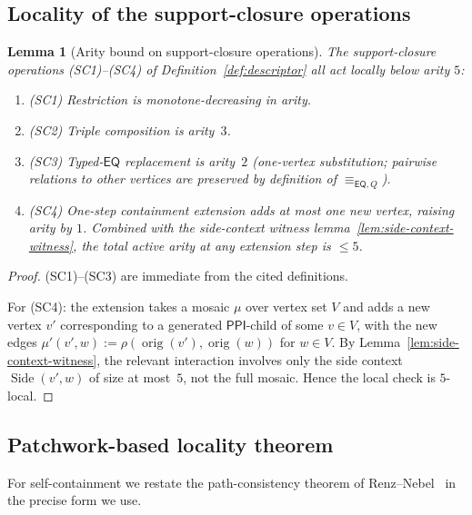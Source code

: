 \documentclass[11pt]{article}
\newtheorem{lemma}[theorem]{Lemma}
\theoremstyle{definition}
\theoremstyle{remark}
\newcommand{\PPI}{\mathsf{PPI}}
\newcommand{\EQ}{\mathsf{EQ}}
\newcommand{\orig}{\operatorname{orig}}
\newcommand{\eqQ}{\equiv_{\EQ,Q}}
\newcommand{\Side}{\operatorname{Side}}
\begin{document}
\subsection{Locality of the support-closure operations}

\begin{lemma}[Arity bound on support-closure operations]
\label{lem:closure-arity}
The support-closure operations (SC1)--(SC4) of
Definition~\ref{def:descriptor} all act locally below arity $5$:
\begin{enumerate}[label=(\roman*),leftmargin=2em]
\item (SC1) Restriction is monotone-decreasing in arity.
\item (SC2) Triple composition is arity~$3$.
\item (SC3) Typed-$\EQ$ replacement is arity~$2$
  (one-vertex substitution; pairwise relations to other vertices
  are preserved by definition of $\eqQ$).
\item (SC4) One-step containment extension adds at most one new
  vertex, raising arity by $1$.  Combined with the side-context
  witness lemma~\ref{lem:side-context-witness}, the total active
  arity at any extension step is $\le 5$.
\end{enumerate}
\end{lemma}

\begin{proof}
(SC1)--(SC3) are immediate from the cited definitions.

For (SC4): the extension takes a mosaic $\mu$ over vertex set $V$ and
adds a new vertex $v'$ corresponding to a generated $\PPI$-child of
some $v\in V$, with the new edges
$\mu'(v',w):=\rho(\orig(v'),\orig(w))$ for $w\in V$.  By
Lemma~\ref{lem:side-context-witness}, the relevant interaction
involves only the side context $\Side(v',w)$ of size at most~$5$,
not the full mosaic.  Hence the local check is $5$-local.\end{proof}

\subsection{Patchwork-based locality theorem}

For self-containment we restate the path-consistency theorem of
Renz--Nebel~\cite{RenzNebel} in the precise form we use.
\end{document}
